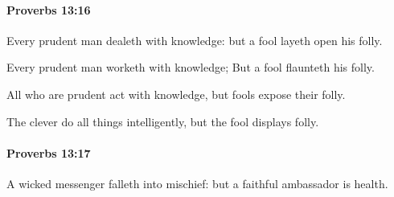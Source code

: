 		\paragraph{Proverbs 13:16} %
			\label{PROVERBS-13-16}

			Every prudent man dealeth with knowledge: but a fool layeth open his folly.

			\begin{versebox}
					\item[BHS] 
					\item[ASV] Every prudent man worketh with knowledge; But a fool flaunteth his folly.
					\item[NIV] All who are prudent act with knowledge, but fools expose their folly.
					\item[NRSV] The clever do all things intelligently, but the fool displays folly.
			\end{versebox}

		\paragraph{Proverbs 13:17} %
			\label{PROVERBS-13-17}

			A wicked messenger falleth into mischief: but a faithful ambassador is health.

